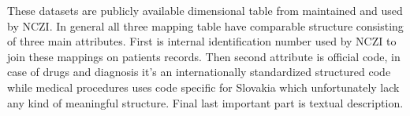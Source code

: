 These datasets are publicly available dimensional table from maintained and used by NCZI. In general all three mapping table have comparable structure consisting of three main attributes. First is internal identification number used by NCZI to join these mappings on patients records. Then second attribute is official code, in case of drugs and diagnosis it's an internationally standardized structured code while medical procedures uses code specific for Slovakia which unfortunately lack any kind of meaningful structure. Final last important part is textual description. 



